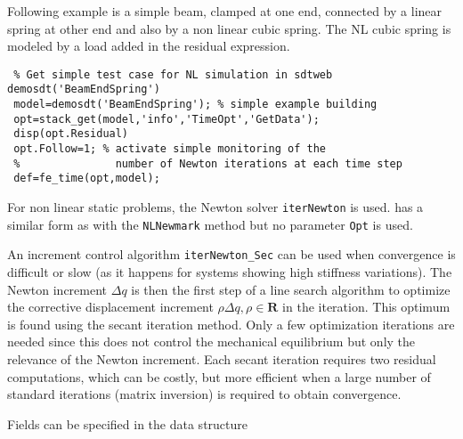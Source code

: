 Following example is a simple beam, clamped at one end, connected by a linear spring at other end and also by a non linear cubic spring. The NL cubic spring is modeled by a load added in the residual expression.

\begin{verbatim}
 % Get simple test case for NL simulation in sdtweb demosdt('BeamEndSpring')
 model=demosdt('BeamEndSpring'); % simple example building
 opt=stack_get(model,'info','TimeOpt','GetData');
 disp(opt.Residual)
 opt.Follow=1; % activate simple monitoring of the 
 %               number of Newton iterations at each time step
 def=fe_time(opt,model);
\end{verbatim}%



For non linear static problems, the Newton solver {\tt iterNewton} is used. {} has a similar form as with the {\tt NLNewmark} method but no parameter {\tt Opt} is used.

An increment control algorithm {\tt iterNewton\_Sec} can be used when convergence is difficult or slow (as it happens for systems showing high stiffness variations). The Newton increment $\Delta q$ is then the first step of a line search algorithm to optimize the corrective displacement increment $\rho \Delta q, \rho\in \mathcal{\mathbf{R}}$ in the iteration. This optimum is found using the secant iteration method. Only a few optimization iterations are needed since this does not control the mechanical equilibrium but only the relevance of the Newton increment. Each secant iteration requires two residual computations, which can be costly, but more efficient when a large number of standard iterations (matrix inversion) is required to obtain convergence.

Fields can be specified in the {} data structure

